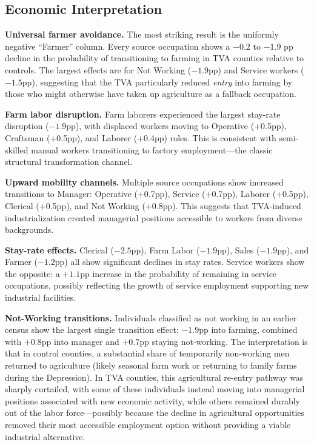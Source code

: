 \documentclass[12pt]{article}
\begin{document}
\subsection{Economic Interpretation}

\textbf{Universal farmer avoidance.} The most striking result is the uniformly negative ``Farmer'' column. Every source occupation shows a $-0.2$ to $-1.9$ pp decline in the probability of transitioning to farming in TVA counties relative to controls. The largest effects are for Not Working ($-1.9$pp) and Service workers ($-1.5$pp), suggesting that the TVA particularly reduced \textit{entry} into farming by those who might otherwise have taken up agriculture as a fallback occupation.

\textbf{Farm labor disruption.} Farm laborers experienced the largest stay-rate disruption ($-1.9$pp), with displaced workers moving to Operative (+0.5pp), Craftsman (+0.5pp), and Laborer (+0.4pp) roles. This is consistent with semi-skilled manual workers transitioning to factory employment---the classic structural transformation channel.

\textbf{Upward mobility channels.} Multiple source occupations show increased transitions to Manager: Operative (+0.7pp), Service (+0.7pp), Laborer (+0.5pp), Clerical (+0.5pp), and Not Working (+0.8pp). This suggests that TVA-induced industrialization created managerial positions accessible to workers from diverse backgrounds.

\textbf{Stay-rate effects.} Clerical ($-2.5$pp), Farm Labor ($-1.9$pp), Sales ($-1.9$pp), and Farmer ($-1.2$pp) all show significant declines in stay rates. Service workers show the opposite: a $+1.1$pp increase in the probability of remaining in service occupations, possibly reflecting the growth of service employment supporting new industrial facilities.

\textbf{Not-Working transitions.} Individuals classified as not working in an earlier census show the largest single transition effect: $-1.9$pp into farming, combined with $+0.8$pp into manager and $+0.7$pp staying not-working. The interpretation is that in control counties, a substantial share of temporarily non-working men returned to agriculture (likely seasonal farm work or returning to family farms during the Depression). In TVA counties, this agricultural re-entry pathway was sharply curtailed, with some of these individuals instead moving into managerial positions associated with new economic activity, while others remained durably out of the labor force---possibly because the decline in agricultural opportunities removed their most accessible employment option without providing a viable industrial alternative.
\end{document}
